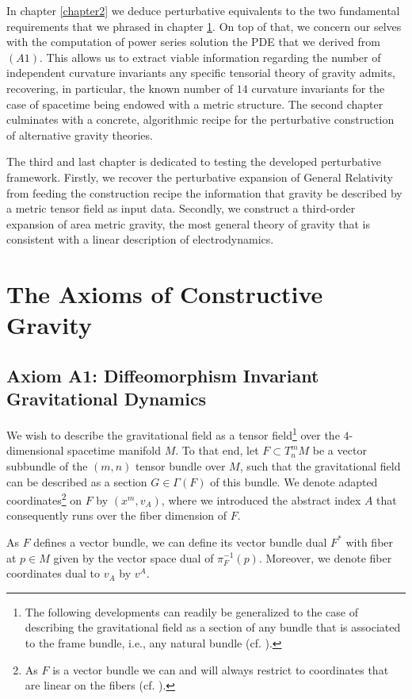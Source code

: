 \documentclass[%
preprint,
nofootinbib,
amsmath,amssymb,
aps,
prd,
floatfix,
]{revtex4-2}
\begin{document}
In chapter \ref{chapter2} we deduce perturbative equivalents to the two fundamental requirements that we phrased in chapter \ref{chapter1}. On top of that, we concern our selves with the computation of power series solution the PDE that we derived from $(A1)$. This allows us to extract viable information regarding the number of independent curvature invariants any specific tensorial theory of gravity admits, recovering, in particular, the known number of $14$ curvature invariants for the case of spacetime being endowed with a metric structure. 
The second chapter culminates with a concrete, algorithmic recipe for the perturbative construction of alternative gravity theories. 

The third and last chapter is dedicated to testing the developed perturbative framework. Firstly, we recover the perturbative expansion of General Relativity from feeding the construction recipe the information that gravity be described by a metric tensor field as input data.
Secondly, we construct a third-order expansion of area metric gravity, the most general theory of gravity that is consistent with a linear description of electrodynamics.

\section{The Axioms of Constructive Gravity}\label{chapter1}
\subsection{Axiom A1: Diffeomorphism Invariant Gravitational Dynamics }

We wish to describe the gravitational field as a tensor field\footnote{The following developments can readily be generalized to the case of describing the gravitational field as a section of any bundle that is associated to the frame bundle, i.e., any natural bundle (cf. \cite{kolar1993natural}).} over the $4$-dimensional spacetime manifold $M$. To that end, let $F \subset T^m_nM$ be a vector subbundle of the $(m,n)$ tensor bundle over $M$, such that the gravitational field can be described as a section $G \in \Gamma(F)$ of this bundle. 
We denote adapted coordinates\footnote{As $F$ is a vector bundle we can and will always restrict to coordinates that are linear on the fibers (cf. \cite{saunders_1989}).} on $F$ by $(x^m,v_A)$, where we introduced the abstract index $A$ that consequently runs over the fiber dimension of $F$.

As $F$ defines a vector bundle, we can define its vector bundle dual $F^{\ast}$ with fiber at $p\in M$ given by the vector space dual of $\pi_F^{-1}(p)$.
Moreover, we denote fiber coordinates dual to $v_A$ by $v^A$.
\end{document}
